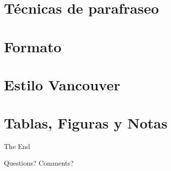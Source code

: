\documentclass[
11pt, %
]{beamer}
\begin{document}
\section{Técnicas de parafraseo}

\section{Formato}

\section{Estilo Vancouver}

\section{Tablas, Figuras y Notas}


\begin{frame}[plain] %
	\begin{center}
		{\Huge The End}

		\bigskip\bigskip %

		{\LARGE Questions? Comments?}
	\end{center}
\end{frame}

\end{document}
